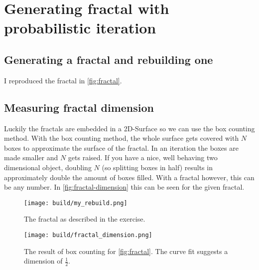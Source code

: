 \section{Generating fractal with probabilistic iteration}
\label{sec:exercise-2}

\subsection{Generating a fractal and rebuilding one}
I reproduced the fractal in \autoref{fig:fractal}.

\subsection{Measuring fractal dimension}
Luckily the fractals are embedded in a 2D-Surface so we can use the box counting method. With the box counting method,
the whole surface gets covered with $N$ boxes to approximate the surface of the fractal. In an iteration the boxes are
made smaller and $N$ gets raised. If you have a nice, well behaving two dimensional object, doubling $N$ (so splitting
boxes in half) results in approximately double the amount of boxes filled. With a fractal however, this can be any
number. In \autoref{fig:fractal-dimension} this can be seen for the given fractal.

\begin{figure}
	\centering
  \texttt{[image: build/my\_rebuild.png]}
  \caption{The fractal as described in the exercise.}
  \label{fig:fractal}
\end{figure}
\begin{figure}
	\centering
  \texttt{[image: build/fractal\_dimension.png]}
  \caption{The result of box counting for \autoref{fig:fractal}. The curve fit suggests a dimension of $\frac12$.}
  \label{fig:fractal-dimension}
\end{figure}
